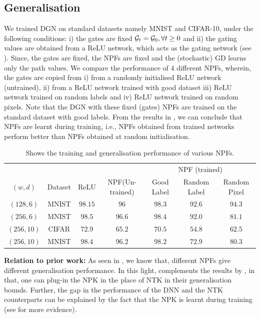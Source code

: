 \subsection{Generalisation}\label{sec:generalisation}
We trained DGN on standard datasets namely MNIST and CIFAR-10, under the following conditions: i) the gates are fixed $\mathcal{G}_t=\mathcal{G}_0,\forall t\geq 0$ and ii) the gating values are obtained from a ReLU network, which acts as the gating network (see ). Since, the gates are fixed, the NPFs are fixed and the (stochastic) GD learns only the path values. We compare the performance of $4$ different NPFs, wherein, the gates are copied from i) from a randomly initialised ReLU network (untrained), ii) from a ReLU network trained with good dataset iii) ReLU network trained on random labels and iv) ReLU network trained on random pixels. Note that the DGN with these fixed (gates) NPFs are trained on the standard dataset with good labels. From the results in , we can conclude that NPFs are learnt during training, i.e., NPFs obtained from trained networks perform better than NPFs obtained at random initialisation.\\
\begin{table}[!b]
\begin{tabular}{|c|c|c|c|c|c|c|}\hline
&&&&\multicolumn{3}{c|}{NPF (trained)}\\\cline{5-7}
$(w,d)$	&Dataset		&ReLU		&NPF(Un-trained) 		&Good Label		&Random Label 	&Random Pixel\\\hline
$(128,6)$	& MNIST 		& $98.15$ 		&$96$ 		&$98.3$		&$92.6$			&$94.3$\\\hline
$(256,6)$	& MNIST 		& $98.5$ 		&$96.6$ 		&$98.4$		&$92.0$			&$81.1$\\\hline
$(256,10)$	& CIFAR 		& $72.9$ 		&$65.2$ 		&$70.5$		&$54.8$			&$62.5$\\\hline
$(256,10)$	& MNIST 		& $98.4$ 		&$96.2$ 		&$98.2$		&$72.9$			&$80.3$\\\hline
\end{tabular}
\caption{Shows the training and generalisation performance of various NPFs.}
\label{tb:npfs}
\end{table}
\textbf{Relation to prior work:} As seen in , we know that, different NPFs give different generalisation performance. In this light,  complements the results by \cite{arora2019exact,cao2019generalization}, in that, one can plug-in the NPK in the place of NTK in their generalisation bounds. Further, the gap in the performance of the DNN and the NTK counterparts can be explained by the fact that the NPK is learnt during training (see  for more evidence).\\
